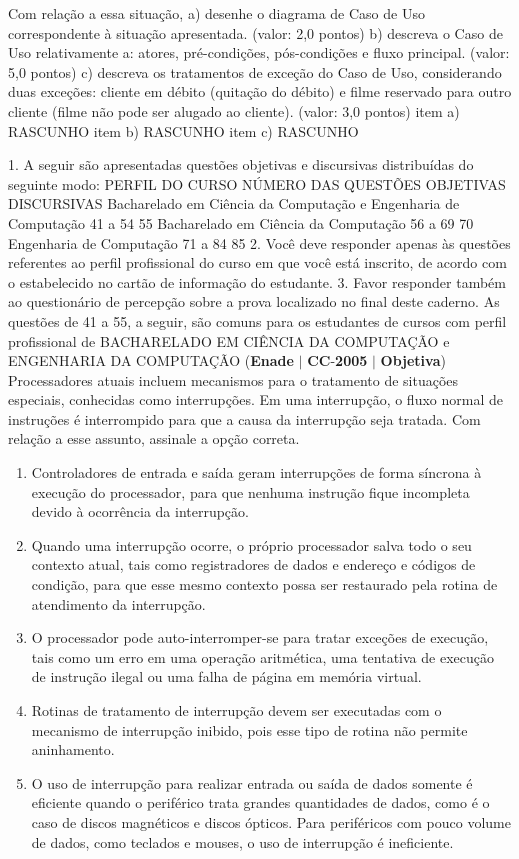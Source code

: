 \documentclass{exam}
\begin{document}
\begin{questions}
Com relação a essa situação,
a) desenhe o diagrama de Caso de Uso correspondente à situação apresentada. (valor: 2,0 pontos)
b) descreva o Caso de Uso relativamente a: atores, pré-condições, pós-condições e fluxo principal. (valor: 5,0 pontos)
c) descreva os tratamentos de exceção do Caso de Uso, considerando duas exceções: cliente em débito (quitação do débito) e filme
reservado para outro cliente (filme não pode ser alugado ao cliente). (valor: 3,0 pontos)
item a) RASCUNHO
item b) RASCUNHO
item c) RASCUNHO

1. A seguir são apresentadas questões objetivas e discursivas distribuídas do seguinte modo:
PERFIL DO CURSO
NÚMERO DAS QUESTÕES
OBJETIVAS DISCURSIVAS
Bacharelado em Ciência da Computação e
Engenharia de Computação
41 a 54 55
Bacharelado em Ciência da Computação 56 a 69 70
Engenharia de Computação 71 a 84 85
2. Você deve responder apenas às questões referentes ao perfil profissional do curso em que
você está inscrito, de acordo com o estabelecido no cartão de informação do estudante.
3. Favor responder também ao questionário de percepção sobre a prova localizado no final
deste caderno.
As questões de 41 a 55, a seguir, são comuns para os estudantes de cursos com perfil profissional de
BACHARELADO EM CIÊNCIA DA COMPUTAÇÃO e ENGENHARIA DA COMPUTAÇÃO
\question (\textbf{Enade} $|$ \textbf{CC}-\textbf{2005} $|$ \textbf{Objetiva})
Processadores atuais incluem mecanismos para o tratamento
de situações especiais, conhecidas como interrupções. Em uma
interrupção, o fluxo normal de instruções é interrompido para
que a causa da interrupção seja tratada. Com relação a esse
assunto, assinale a opção correta.
	\begin{enumerate}[label=\alph*)]
		\item  Controladores de entrada e saída geram interrupções de
forma síncrona à execução do processador, para que
nenhuma instrução fique incompleta devido à ocorrência
da interrupção.
		\item  Quando uma interrupção ocorre, o próprio processador
salva todo o seu contexto atual, tais como registradores de
dados e endereço e códigos de condição, para que esse
mesmo contexto possa ser restaurado pela rotina de
atendimento da interrupção.
		\item  O processador pode auto-interromper-se para tratar
exceções de execução, tais como um erro em uma
operação aritmética, uma tentativa de execução de
instrução ilegal ou uma falha de página em memória
virtual.
		\item  Rotinas de tratamento de interrupção devem ser executadas
com o mecanismo de interrupção inibido, pois esse tipo de
rotina não permite aninhamento.
		\item  O uso de interrupção para realizar entrada ou saída de
dados somente é eficiente quando o periférico trata
grandes quantidades de dados, como é o caso de discos
magnéticos e discos ópticos. Para periféricos com pouco
volume de dados, como teclados e mouses, o uso de
interrupção é ineficiente.
	\end{enumerate}


\end{questions}
\end{document}
